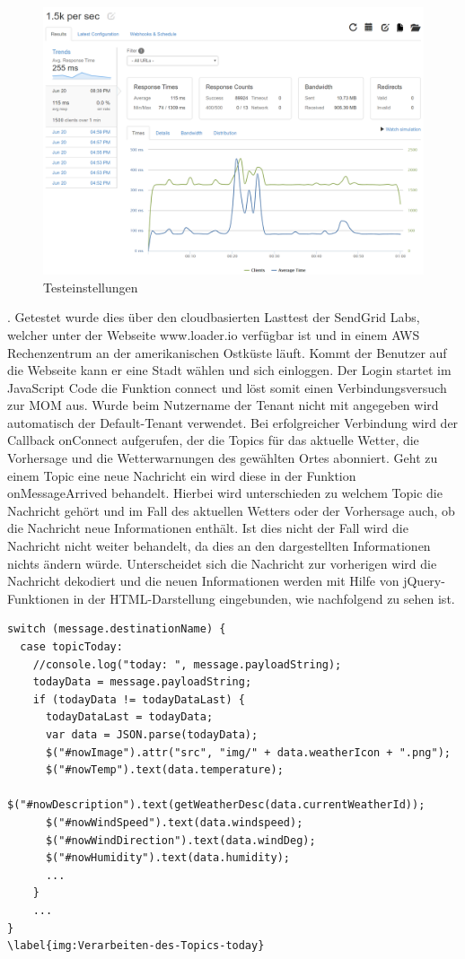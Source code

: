 \begin{figure}[htbp]
	\centering
	\includegraphics[width=1.0\textwidth]{Bilder/Web-TestErgebnisse.png}
	\caption{Testeinstellungen}
	\label{img:testresults}
\end{figure}
. Getestet wurde dies über den cloudbasierten Lasttest der SendGrid Labs, welcher unter der Webseite www.loader.io verfügbar ist und in einem AWS Rechenzentrum an der amerikanischen Ostküste läuft. 
Kommt der Benutzer auf die Webseite kann er eine Stadt wählen und sich einloggen. Der Login startet im JavaScript Code die Funktion connect und löst somit einen Verbindungsversuch zur MOM aus. Wurde beim Nutzername der Tenant nicht mit angegeben wird automatisch der Default-Tenant verwendet. Bei erfolgreicher Verbindung wird der Callback onConnect aufgerufen, der die Topics für das aktuelle Wetter, die Vorhersage und die Wetterwarnungen des gewählten Ortes abonniert. Geht zu einem Topic eine neue Nachricht ein wird diese in der Funktion onMessageArrived behandelt. Hierbei wird unterschieden zu welchem Topic die Nachricht gehört und im Fall des aktuellen Wetters oder der Vorhersage auch, ob die Nachricht neue Informationen enthält. Ist dies nicht der Fall wird die Nachricht nicht weiter behandelt, da dies an den dargestellten Informationen nichts ändern würde. Unterscheidet sich die Nachricht zur vorherigen wird die Nachricht dekodiert und die neuen Informationen werden mit Hilfe von jQuery-Funktionen in der HTML-Darstellung eingebunden, wie nachfolgend zu sehen ist. 
\begin{lstlisting} 
switch (message.destinationName) {
  case topicToday:
    //console.log("today: ", message.payloadString);
    todayData = message.payloadString;
    if (todayData != todayDataLast) {
      todayDataLast = todayData;
      var data = JSON.parse(todayData);
      $("#nowImage").attr("src", "img/" + data.weatherIcon + ".png");
      $("#nowTemp").text(data.temperature);
      $("#nowDescription").text(getWeatherDesc(data.currentWeatherId));
      $("#nowWindSpeed").text(data.windspeed);
      $("#nowWindDirection").text(data.windDeg);
      $("#nowHumidity").text(data.humidity);
      ...      
    }
    ...
}
\label{img:Verarbeiten-des-Topics-today}
\end{lstlisting}


